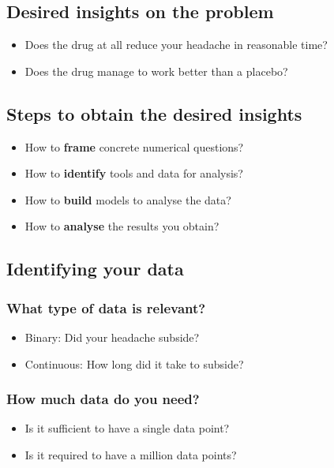 \documentclass[11pt]{article}
\begin{document}
\subsection{Desired insights on the problem}
\label{sec:orgcd977d5}
\begin{itemize}
\item Does the drug at all reduce your headache in reasonable time?
\item Does the drug manage to work better than a placebo?
\end{itemize}

\subsection{Steps to obtain the desired insights}
\label{sec:org4c462af}
\begin{itemize}
\item How to \textbf{frame} concrete numerical questions?
\item How to \textbf{identify} tools and data for analysis?
\item How to \textbf{build} models to analyse the data?
\item How to \textbf{analyse} the results you obtain?
\end{itemize}

\subsection{Identifying your data}
\label{sec:org244e23e}

\subsubsection{What type of data is relevant?}
\label{sec:orgf1d600f}
\begin{itemize}
\item Binary: Did your headache subside?
\item Continuous: How long did it take to subside?
\end{itemize}

\subsubsection{How much data do you need?}
\label{sec:orgcebe3c2}
\begin{itemize}
\item Is it sufficient to have a single data point?
\item Is it required to have a million data points?
\end{itemize}
\end{document}

